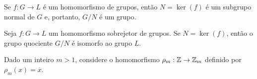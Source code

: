 \documentclass{beamer}
\begin{document}
    \begin{frame}
        \begin{lema}
            Se $f : G \to L$ \'e um homomorfismo de grupos, \pause ent\~ao $N = \ker(f)$ \pause \'e um subgrupo normal de $G$ \pause e, portanto, $G/N$ \'e um grupo.
        \end{lema}
    \end{frame}

    \begin{frame}
        \begin{teorema}
            Seja $f : G \to L$ um homomorfismo sobrejetor \pause de grupos. \pause Se $N = \ker(f)$, \pause ent\~ao o grupo quociente $G/N$ \'e isomorfo ao grupo $L$.
        \end{teorema}
    \end{frame}

    \begin{frame}
        \begin{exemplo}
            Dado um inteiro $m > 1$, \pause considere o homomorfismo $\rho_m : \mathbb{Z} \to \mathbb{Z}_m$ \pause definido por $\rho_m(x) = \overline{x}$.
        \end{exemplo}
    \end{frame}
    
\end{document}
